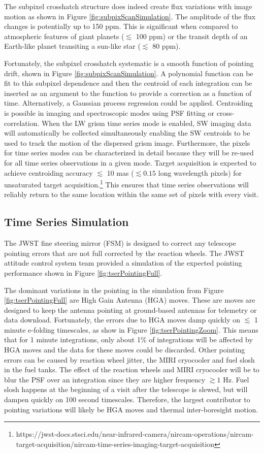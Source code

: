 \documentclass[]{aastex62}
\begin{document}
The subpixel crosshatch structure does indeed create flux variations with image motion as shown in Figure \ref{fig:subpixScanSimulation}.
The amplitude of the flux changes is potentially up to 150 ppm.
This is significant when compared to atmospheric features of giant planets ($\lesssim$ 100 ppm) or the transit depth of an Earth-like planet transiting a sun-like star ($\lesssim$ 80 ppm).

Fortunately, the subpixel crosshatch systematic is a smooth function of pointing drift, shown in Figure \ref{fig:subpixScanSimulation}.
A polynomial function can be fit to this subpixel dependence and then the centroid of each integration can be inserted as an argument to the function to provide a correction as a function of time.
Alternatively, a Gaussian process regression could be applied.
Centroiding is possible in imaging and spectroscopic modes using PSF fitting or cross-correlation.
When the LW grism time series mode is enabled, SW imaging data will automatically be collected simultaneously enabling the SW centroids to be used to track the motion of the dispersed grism image.
Furthermore, the pixels for time series modes can be characterized in detail because they will be re-used for all time series observations in a given mode.
Target acquisition is expected to achieve centroiding accuracy $\lesssim$ 10 mas ($\lesssim 0.15$ long wavelength pixels) for unsaturated target acquisition.\footnote{https://jwst-docs.stsci.edu/near-infrared-camera/nircam-operations/nircam-target-acquisition/nircam-time-series-imaging-target-acquisition}
This ensures that time series observations will reliably return to the same location within the same set of pixels with every visit.

\subsection{Time Series Simulation}
The JWST fine steering mirror (FSM) is designed to correct any telescope pointing errors that are not full corrected by the reaction wheels.
The JWST attitude control system team provided a simulation of the expected pointing performance shown in Figure \ref{fig:tserPointingFull}.

The dominant variations in the pointing in the simulation from Figure \ref{fig:tserPointingFull} are High Gain Antenna (HGA) moves.
These are moves are designed to keep the antenna pointing at ground-based antennas for telemetry or data download.
Fortunately, the errors due to HGA moves damp quickly on $\lesssim$ 1 minute e-folding timescales, as show in Figure \ref{fig:tserPointingZoom}.
This means that for 1 minute integrations, only about 1\% of integrations will be affected by HGA moves and the data for these moves could be discarded.
Other pointing errors can be caused by reaction wheel jitter, the MIRI cryocooler and fuel slosh in the fuel tanks.
The effect of the reaction wheels and MIRI cryocooler will be to blur the PSF over an integration since they are higher frequency $\gtrsim 1$ Hz.
Fuel slosh happens at the beginning of a visit after the telescope is slewed, but will dampen quickly on 100 second timescales.
Therefore, the largest contributor to pointing variations will likely be HGA moves and thermal inter-boresight motion.
\end{document}

